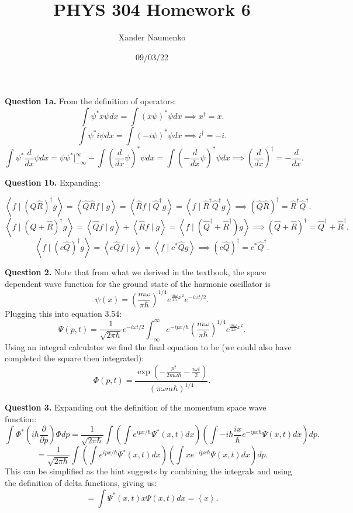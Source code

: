 \documentclass[letterpaper, reqno,11pt]{article}
\begin{document}
\title{PHYS 304 Homework 6}
\date{09/03/22}
\author{Xander Naumenko}
\maketitle

{\noindent\bf Question 1a.} From the definition of operators: 
\[
\int \psi^* x\psi dx=\int(x\psi)^*\psi dx\implies x^\dagger=x
.\]
\[
\int \psi^* i\psi dx=\int(-i\psi)^*\psi dx\implies i^\dagger=-i
.\]
\[
\int \psi^* \frac{d}{dx}\psi dx=\psi\psi^*\bigg|_{-\infty}^{\infty}-\int(\frac{d}{dx}\psi)^*\psi dx=\int(-\frac{d}{dx}\psi)^*\psi dx\implies \left( \frac{d}{dx} \right) ^\dagger=-\frac{d}{dx}
.\]

{\noindent\bf Question 1b.} Expanding: 

\[
\left<f\mid \left( \hat{Q}\hat{R} \right)^{\dagger}g  \right>=\left<\hat{Q}\hat{R}f\mid g \right>=\left<\hat{R} f\mid \hat{Q}^{\dagger}g \right>=\left<f\mid \hat{R}^{\dagger}\hat{Q}^{\dagger}g \right>\implies\left( \hat{Q}\hat{R} \right) ^{\dagger}=\hat{R}^{\dagger}\hat{Q}^{\dagger}
.\]
\[
\left<f\mid \left( \hat{Q}+\hat{R} \right) ^{\dagger}g \right>=\left<\hat{Q}f\mid g \right>+\left<\hat{R}f\mid g \right>=\left<f\mid \left( \hat{Q}^{\dagger} +\hat{R}^{\dagger}\right) g \right>\implies \left( \hat{Q} +\hat{R}\right)^{\dagger}=\hat{Q}^{\dagger}+\hat{R}^{\dagger}
.\]
\[
\left<f\mid \left( c\hat{Q} \right) ^{\dagger}g \right>=\left<c\hat{Q} f\mid g \right>=\left<f\mid c^*\hat{Q}g \right>\implies \left( c\hat{Q} \right) ^{\dagger}=c^*\hat{Q}^{\dagger}
.\]

{\noindent\bf Question 2.} Note that from what we derived in the textbook, the space dependent wave function for the ground state of the harmonic oscillator is 
\[
\psi(x)=\left( \frac{m\omega}{\pi \hbar} \right)^{1 /4}e^{\frac{m\omega}{2\hbar}x^2}e^{-i\omega t /2}
.\]
Plugging this into equation 3.54: 
\[
\Psi(p, t)=\frac{1}{\sqrt{2\pi\hbar} }e^{-i\omega t /2}\int_{-\infty}^{\infty}e^{-ipx /\hbar}\left( \frac{m\omega}{\pi \hbar} \right)^{1 /4}e^{\frac{m\omega}{2\hbar}x^2}
.\]
Using an integral calculator we find the final equation to be (we could also have completed the square then integrated): 
\[
\Phi(p, t)=\frac{\exp\left( -\frac{p^2}{2m\omega\hbar}- \frac{i\omega t}{2} \right) }{\left( \pi \omega m \hbar \right)^{1 /4} }
.\]

{\noindent\bf Question 3.} Expanding out the definition of the momentum space wave function: 
\[
\int \Phi^* \left( i\hbar \frac{\partial}{\partial p} \right) \Phi dp=\frac{1}{\sqrt{2\pi \hbar} }\int \left(\int e^{ipx /\hbar}\Psi^*(x, t)dx\right)\left( \int -i \hbar \frac{ix}{\hbar} e^{-ipx \hbar}\Psi(x, t)dx \right) dp
.\]
\[
=\frac{1}{\sqrt{2\pi \hbar} }\int \left(\int e^{ipx /\hbar}\Psi^*(x, t)dx\right)\left( \int x e^{-ipx \hbar}\Psi(x, t)dx \right) dp
.\]
This can be simplified as the hint suggests by combining the integrals and using the definition of delta functions, giving us: 
\[
=\int \Psi^*(x, t) x \Psi(x, t)dx=\left<x \right>
.\]
\end{document}
